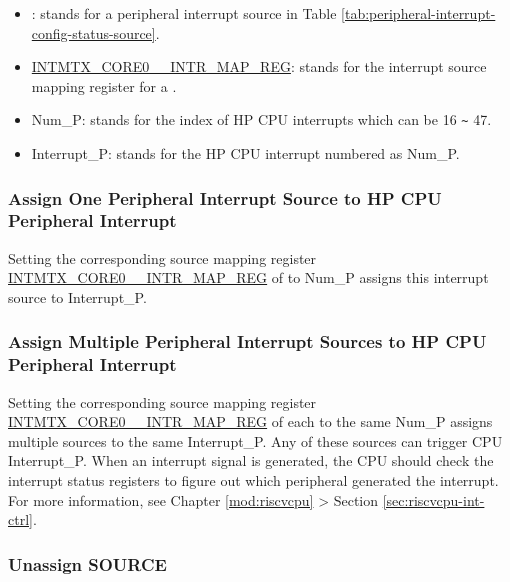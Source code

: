 \documentclass[main\_\_EN.tex]{subfiles}
\begin{document}
\begin{itemize}

\item {}: stands for a peripheral interrupt source in Table \ref{tab:peripheral-interrupt-config-status-source}.

\item \hyperref[INTMTXCORE0SOURCEINTRMAPREG]{INTMTX\_CORE0\_\_INTR\_MAP\_REG}: stands for the interrupt source mapping register for a .

\item Num\_P: stands for the index of HP CPU interrupts which can be 16 \verb+~+ 47.

\item Interrupt\_P: stands for the HP CPU interrupt numbered as Num\_P.
\end{itemize}

\subsubsection{Assign One Peripheral Interrupt Source to HP CPU Peripheral Interrupt}

Setting the corresponding source mapping register \hyperref[INTMTXCORE0SOURCEINTRMAPREG]{INTMTX\_CORE0\_\_INTR\_MAP\_REG} of  to Num\_P assigns this interrupt source to Interrupt\_P.

\subsubsection{Assign Multiple Peripheral Interrupt Sources to HP CPU Peripheral Interrupt}

Setting the corresponding source mapping register \hyperref[INTMTXCORE0SOURCEINTRMAPREG]{INTMTX\_CORE0\_\_INTR\_MAP\_REG} of each  to the same Num\_P assigns multiple sources to the same Interrupt\_P. Any of these sources can trigger CPU Interrupt\_P. When an interrupt signal is generated, the CPU should check the interrupt status registers to figure out which peripheral generated the interrupt. For more information, see Chapter \ref{mod:riscvcpu} \textit{} > Section \ref{sec:riscvcpu-int-ctrl}\textit{}.

\subsubsection{Unassign SOURCE}
\end{document}
